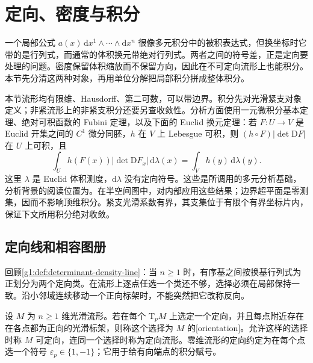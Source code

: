 
% 
% 

\section{定向、密度与积分}
\label{g1:sec:1403}

一个局部公式 \(a(x)\,\mathrm{d}x^1\wedge\cdots\wedge\mathrm{d}x^n\) 很像多元积分中的被积表达式，但换坐标时它带的是行列式，而通常的体积换元带绝对行列式。两者之间的符号差，正是定向要处理的问题。密度保留体积缩放而不保留方向，因此在不可定向流形上也能积分。本节先分清这两种对象，再用单位分解把局部积分拼成整体积分。

\ProseParagraphBreak

本节流形均有限维、Hausdorff、第二可数，可以带边界。积分先对光滑紧支对象定义；非紧流形上的非紧支积分还要另查收敛性。分析方面使用一元微积分基本定理、绝对可积函数的 Fubini 定理，以及下面的 Euclid 换元定理：若 \(F:U\to V\) 是 Euclid 开集之间的 \(C^1\) 微分同胚，\(h\) 在 \(V\) 上 Lebesgue 可积，则 \((h\circ F)|\det \mathrm{D}F|\) 在 \(U\) 上可积，且
\begin{equation}\label{g1:eq:euclidean-integration-input}
	\int_U h(F(x))|\det \mathrm{D}F_x|\,\mathrm{d}\lambda(x)=\int_V h(y)\,\mathrm{d}\lambda(y).
\end{equation}
这里 \(\lambda\) 是 Euclid 体积测度，\(\mathrm{d}\lambda\) 没有定向符号。这些是所调用的多元分析基础，分析背景的阅读位置为\cite[附录C, Multiple Integrals, 第649--655页]{Lee2012Smooth}。在半空间图中，对内部应用这些结果；边界超平面是零测集，因而不影响顶维积分。紧支光滑系数有界，其支集位于有限个有界坐标片内，保证下文所用积分绝对收敛。

\subsection{定向线和相容图册}
\label{g1:subsec:1403:01}

回顾\cref{g1:def:determinant-density-line}：当 \(n\geq1\) 时，有序基之间按换基行列式为正划分为两个定向类。在流形上逐点任选一个类还不够，选择必须在局部保持一致。沿小邻域连续移动一个正向标架时，不能突然把它改称反向。

\begin{definition}
	\label{g1:def:manifold-orientation}
	设 \(M\) 为 \(n\geq1\) 维光滑流形。若在每个 \(\mathrm{T}_pM\) 上选定一个定向，并且每点附近存在在各点都为正向的光滑标架，则称这个选择为 \(M\) 的[orientation]。允许这样的选择时称 \(M\) 可定向，连同一个选择时称为定向流形。零维流形的定向约定为在每个点选一个符号 \(\varepsilon_p\in\{1,-1\}\)；它用于给有向端点的积分赋号。
\end{definition}


